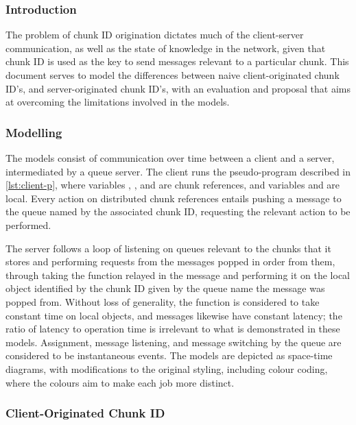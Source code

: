 \subsubsection{Introduction}

The problem of chunk ID origination dictates much of the client-server communication, as well as the state of knowledge in the network, given that chunk ID is used as the key to send messages relevant to a particular chunk.
This document serves to model the differences between naive client-originated chunk ID's, and server-originated chunk ID's, with an evaluation and proposal that aims at overcoming the limitations involved in the models.

\subsubsection{Modelling}\label{sec:cid-model}

The models consist of communication over time between a client and a server, intermediated by a queue server.
The client runs the pseudo-program described in \cref{lst:client-p}, where variables , , and  are chunk references, and variables  and  are local.
Every action on distributed chunk references entails pushing a  message to the queue named by the associated chunk ID, requesting the relevant action to be performed.


The server follows a loop of listening on queues relevant to the chunks that it stores and performing requests from the messages popped in order from them, through taking the function relayed in the message and performing it on the local object identified by the chunk ID given by the queue name the message was popped from.
Without loss of generality, the function  is considered to take constant time on local objects, and messages likewise have constant latency; the ratio of latency to operation time is irrelevant to what is demonstrated in these models.
Assignment, message listening, and message switching by the queue are considered to be instantaneous events.
The models are depicted as space-time diagrams, with modifications to the original styling\cite{lamport1978ordering}, including colour coding, where the colours aim to make each job more distinct.

\subsubsection{Client-Originated Chunk ID}

